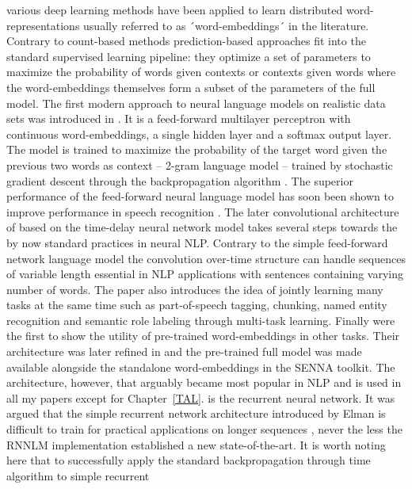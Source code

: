 various deep learning methods have been applied to learn distributed word-representations usually referred to
as ´word-embeddings´ in the literature. Contrary to count-based methods prediction-based approaches fit into the
standard supervised learning pipeline: they optimize a set of parameters to maximize the probability of words
given contexts or contexts given words where the word-embeddings themselves form a subset of the parameters
of the full model. The first modern approach to neural language models on realistic data sets was introduced
in \cite{bengio2003neural}. It is a feed-forward multilayer perceptron with continuous word-embeddings,
a single hidden layer and a softmax output layer. The model is trained to maximize the probability of
the target word given the previous two words as context -- 2-gram language model -- trained by stochastic
gradient descent \cite{cauchy1847methode} through the backpropagation  algorithm \cite{rumelhart1985learning}.
The superior performance of the feed-forward neural language model has soon been shown to
improve performance in speech recognition \cite{schwenk2005training}.
The later convolutional architecture of  \cite{collobert2008unified} based on the time-delay neural network
model \cite{waibel1990phoneme} takes several steps towards the by now standard practices in neural NLP.
Contrary to the simple feed-forward network language model the convolution over-time structure can handle
sequences of variable length essential in NLP applications with sentences containing varying number of words.
The paper also introduces the idea of jointly learning many tasks at the same time such as part-of-speech
tagging, chunking, named entity recognition and semantic role labeling through multi-task learning.
Finally \cite{collobert2008unified} were the first to show the utility of pre-trained word-embeddings
in other tasks. Their architecture was later refined in \cite{collobert2011natural} and the pre-trained
full model was made available alongside the standalone word-embeddings in the SENNA toolkit.
The architecture, however, that arguably became most popular in NLP and is used in all my papers except
for Chapter~\ref{TAL}. is the recurrent neural network. It was argued that the simple recurrent network
architecture introduced by Elman is difficult to train for practical applications on longer sequences
\cite{bengio1994learning}, never the less the RNNLM implementation \cite{mikolov2010recurrent} established
a new state-of-the-art. It is worth noting here that to successfully
apply the standard backpropagation through time algorithm  \cite{williams1995gradient} to simple recurrent
